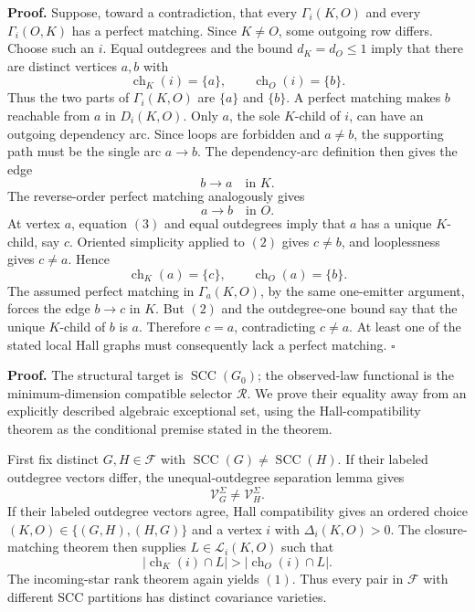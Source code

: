 \textbf{Proof.}
Suppose, toward a contradiction, that every \(\Gamma_i(K,O)\) and every \(\Gamma_i(O,K)\) has a perfect matching.  Since \(K\ne O\), some outgoing row differs.  Choose such an \(i\).  Equal outdegrees and the bound \(d_K=d_O\le1\) imply that there are distinct vertices \(a,b\) with
\[
 \operatorname{ch}_K(i)=\{a\},
 \qquad
 \operatorname{ch}_O(i)=\{b\}.
 \tag{1}
\]
Thus the two parts of \(\Gamma_i(K,O)\) are \(\{a\}\) and \(\{b\}\).  A perfect matching makes \(b\) reachable from \(a\) in \(D_i(K,O)\).  Only \(a\), the sole \(K\)-child of \(i\), can have an outgoing dependency arc.  Since loops are forbidden and \(a\ne b\), the supporting path must be the single arc \(a\to b\).  The dependency-arc definition then gives the edge
\[
 b\to a\quad\text{in }K.
 \tag{2}
\]
The reverse-order perfect matching analogously gives
\[
 a\to b\quad\text{in }O.
 \tag{3}
\]
At vertex \(a\), equation \((3)\) and equal outdegrees imply that \(a\) has a unique \(K\)-child, say \(c\).  Oriented simplicity applied to \((2)\) gives \(c\ne b\), and looplessness gives \(c\ne a\).  Hence
\[
 \operatorname{ch}_K(a)=\{c\},
 \qquad
 \operatorname{ch}_O(a)=\{b\}.
\]
The assumed perfect matching in \(\Gamma_a(K,O)\), by the same one-emitter argument, forces the edge \(b\to c\) in \(K\).  But \((2)\) and the outdegree-one bound say that the unique \(K\)-child of \(b\) is \(a\).  Therefore \(c=a\), contradicting \(c\ne a\).  At least one of the stated local Hall graphs must consequently lack a perfect matching. \(\square\)

\textbf{Proof.}
The structural target is \(\operatorname{SCC}(G_0)\); the observed-law functional is the minimum-dimension compatible selector \(\mathcal R\).  We prove their equality away from an explicitly described algebraic exceptional set, using the Hall-compatibility theorem as the conditional premise stated in the theorem.

First fix distinct \(G,H\in\mathcal F\) with \(\operatorname{SCC}(G)\ne\operatorname{SCC}(H)\).  If their labeled outdegree vectors differ, the unequal-outdegree separation lemma gives
\[
 \mathcal V_G^\Sigma\ne\mathcal V_H^\Sigma.
 \tag{1}
\]
If their labeled outdegree vectors agree, Hall compatibility gives an ordered choice \((K,O)\in\{(G,H),(H,G)\}\) and a vertex \(i\) with \(\Delta_i(K,O)>0\).  The closure-matching theorem then supplies \(L\in\mathcal L_i(K,O)\) such that
\[
 |\operatorname{ch}_K(i)\cap L|>
 |\operatorname{ch}_O(i)\cap L|.
\]
The incoming-star rank theorem again yields \((1)\).  Thus every pair in \(\mathcal F\) with different SCC partitions has distinct covariance varieties.

